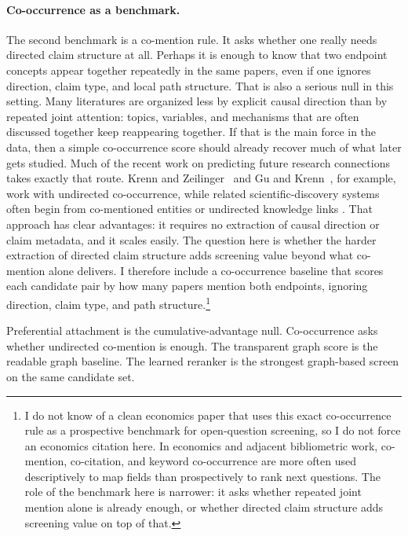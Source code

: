 \documentclass[11pt]{article}
\begin{document}
\paragraph{Co-occurrence as a benchmark.} The second benchmark is a co-mention rule. It asks whether one really needs directed claim structure at all. Perhaps it is enough to know that two endpoint concepts appear together repeatedly in the same papers, even if one ignores direction, claim type, and local path structure. That is also a serious null in this setting. Many literatures are organized less by explicit causal direction than by repeated joint attention: topics, variables, and mechanisms that are often discussed together keep reappearing together. If that is the main force in the data, then a simple co-occurrence score should already recover much of what later gets studied. Much of the recent work on predicting future research connections takes exactly that route. Krenn and Zeilinger~\citeyearpar{krenn2020predicting} and Gu and Krenn~\citeyearpar{gu2025impact4cast}, for example, work with undirected co-occurrence, while related scientific-discovery systems often begin from co-mentioned entities or undirected knowledge links \citep{rzhetsky2015choosing,sourati2023accelerating}. That approach has clear advantages: it requires no extraction of causal direction or claim metadata, and it scales easily. The question here is whether the harder extraction of directed claim structure adds screening value beyond what co-mention alone delivers. I therefore include a co-occurrence baseline that scores each candidate pair by how many papers mention both endpoints, ignoring direction, claim type, and path structure.\footnote{I do not know of a clean economics paper that uses this exact co-occurrence rule as a prospective benchmark for open-question screening, so I do not force an economics citation here. In economics and adjacent bibliometric work, co-mention, co-citation, and keyword co-occurrence are more often used descriptively to map fields than prospectively to rank next questions. The role of the benchmark here is narrower: it asks whether repeated joint mention alone is already enough, or whether directed claim structure adds screening value on top of that.}

Preferential attachment is the cumulative-advantage null. Co-occurrence asks whether undirected co-mention is enough. The transparent graph score is the readable graph baseline. The learned reranker is the strongest graph-based screen on the same candidate set.
\end{document}
